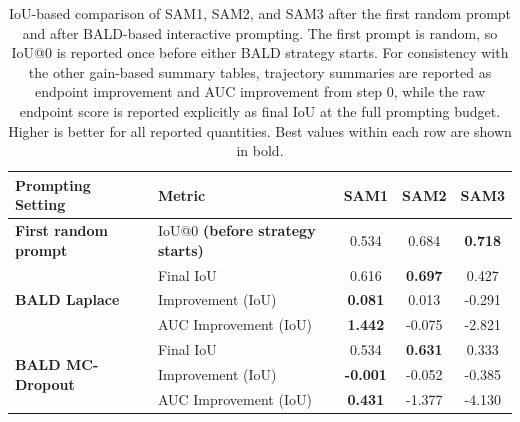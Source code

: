 \begin{table}[t]
\centering
\caption{IoU-based comparison of SAM1, SAM2, and SAM3 after the first random prompt and after BALD-based interactive prompting. The first prompt is random, so IoU@0 is reported once before either BALD strategy starts. For consistency with the other gain-based summary tables, trajectory summaries are reported as endpoint improvement and AUC improvement from step 0, while the raw endpoint score is reported explicitly as final IoU at the full prompting budget. Higher is better for all reported quantities. Best values within each row are shown in bold.}
\label{tab:sam123_iou_comparison}

\footnotesize
\setlength{\tabcolsep}{8pt}
\renewcommand{\arraystretch}{1.15}

\begin{tabular}{llccc}
\toprule
\textbf{Prompting Setting}
& \textbf{Metric}
& \textbf{SAM1}
& \textbf{SAM2}
& \textbf{SAM3} \\
\midrule

\textbf{First random prompt}
& IoU@0 \textbf{(before strategy starts)}
& 0.534
& 0.684
& \textbf{0.718} \\
\midrule

\multirow{3}{*}{\textbf{BALD Laplace}}
& Final IoU
& 0.616
& \textbf{0.697}
& 0.427 \\
& Improvement (IoU)
& \textbf{0.081}
& 0.013
& -0.291 \\
& AUC Improvement (IoU)
& \textbf{1.442}
& -0.075
& -2.821 \\
\midrule

\multirow{3}{*}{\textbf{BALD MC-Dropout}}
& Final IoU
& 0.534
& \textbf{0.631}
& 0.333 \\
& Improvement (IoU)
& \textbf{-0.001}
& -0.052
& -0.385 \\
& AUC Improvement (IoU)
& \textbf{0.431}
& -1.377
& -4.130 \\

\bottomrule
\end{tabular}
\end{table}
